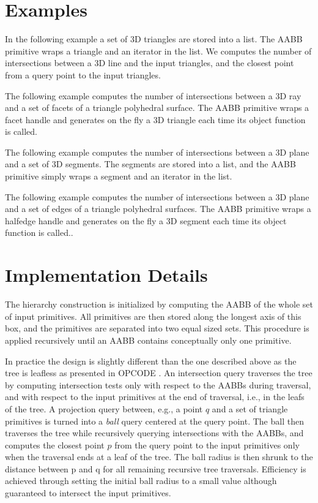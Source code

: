 \section{Examples}
\label{AABB_tree_section_examples}

In the following example a set of 3D triangles are stored into a list. The AABB primitive wraps a triangle and an iterator in the list. We computes the number of intersections between a 3D line and the input triangles, and the closest point from a query point to the input triangles.

The following example computes the number of intersections between a 3D ray and a set of facets of a triangle polyhedral surface. The AABB primitive wraps a facet handle and generates on the fly a 3D triangle each time its object function is called.

The following example computes the number of intersections between a 3D plane and a set of 3D segments. The segments are stored into a list, and the AABB primitive simply wraps a segment and an iterator in the list.

The following example computes the number of intersections between a 3D plane and a set of edges of a triangle polyhedral surfaces. The AABB primitive wraps a halfedge handle and generates on the fly a 3D segment each time its object function is called..

\section{Implementation Details}
\label{AABB_tree_section_intro}

The hierarchy construction is initialized by computing the AABB of the whole set of input primitives. All primitives are then stored along the longest axis of this box, and the primitives are separated into two equal sized sets. This procedure is applied recursively until an AABB contains conceptually only one primitive. 

In practice the design is slightly different than the one described above as the tree is leafless as presented in OPCODE \cite{opcode}. An intersection query traverses the tree by computing intersection tests only with respect to the AABBs during traversal, and with respect to the input primitives at the end of traversal, i.e., in the leafs of the tree. A projection query between, e.g., a point $q$ and a set of triangle primitives is turned into a \emph{ball} query centered at the query point. The ball then traverses the tree while recursively querying intersections with the AABBs, and computes the closest point $p$ from the query point to the input primitives only when the traversal ends at a leaf of the tree. The ball radius is then shrunk to the distance between p and q for all remaining recursive tree traversals. Efficiency is achieved through setting the initial ball radius to a small value although guaranteed to intersect the input primitives.